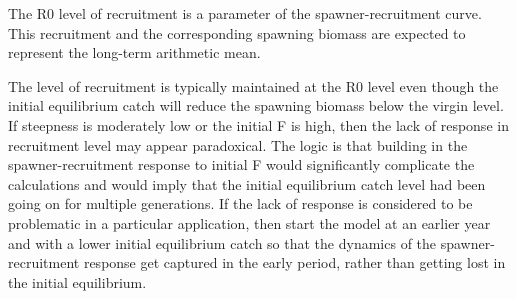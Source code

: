 The R0 level of recruitment is a parameter of the spawner-recruitment curve. This recruitment and the corresponding spawning biomass are expected to represent the long-term arithmetic mean.

The level of recruitment is typically maintained at the R0 level even though the initial equilibrium catch will reduce the spawning biomass below the virgin level. If steepness is moderately low or the initial F is high, then the lack of response in recruitment level may appear paradoxical. The logic is that building in the spawner-recruitment response to initial F would significantly complicate the calculations and would imply that the initial equilibrium catch level had been going on for multiple generations. If the lack of response is considered to be problematic in a particular application, then start the model at an earlier year and with a lower initial equilibrium catch so that the dynamics of the spawner-recruitment response get captured in the early period, rather than getting lost in the initial equilibrium.

